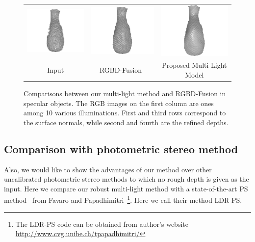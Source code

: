 \begin{figure}[!ht]
{\begin{tabular}{c|c c}
   \includegraphics[height = 0.24\linewidth]{figures/result/robust_vase_shape_init.pdf} 
   &
   \includegraphics[height = 0.24\linewidth]{figures/result/rgbd_vase_shape.pdf} &
   \includegraphics[height = 0.24\linewidth]{figures/result/robust_vase_shape.pdf}\\


   {Input} & {RGBD-Fusion~\cite{or2015rgbd}} & {Proposed Multi-Light Model}               
 \end{tabular}}
\caption{Comparisons between our multi-light method and RGBD-Fusion in specular objects. The RGB images on the first column are ones among 10 various illuminations. First and third rows correspond to the surface normals, while second and fourth are the refined depths.}
\label{fig:comp_specular}
\end{figure}

\subsection{Comparison with photometric stereo method}
Also, we would like to show the advantages of our method over other uncalibrated photometric stereo methods to which no rough depth is given as the input.
Here we compare our robust multi-light method with a state-of-the-art PS method~\cite{favaro2012closed} from Favaro and Papadhimitri~\footnote{The LDR-PS code can be obtained from author's website \url{http://www.cvg.unibe.ch/tpapadhimitri/}}. 
Here we call their method LDR-PS.

